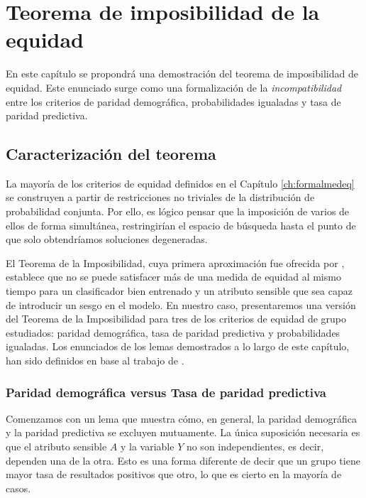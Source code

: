 \documentclass[oneside,openright,titlepage,numbers=noenddot,openany,headinclude,footinclude=true,
cleardoublepage=empty,abstractoff,BCOR=5mm,paper=a4,fontsize=12pt,main=spanish]{scrreprt}
\begin{document}
\chapter{Teorema de imposibilidad de la equidad} \label{ch:teoremaimposibilidad}

En este capítulo se propondrá una demostración del teorema de imposibilidad de equidad. Este enunciado surge como una formalización de la \textit{incompatibilidad} entre los criterios de paridad demográfica, probabilidades igualadas y tasa de paridad predictiva.

\section{Caracterización del teorema}

La mayoría de los criterios de equidad definidos en el Capítulo \ref{ch:formalmedeq} se construyen a partir de restricciones no triviales de la distribución de probabilidad conjunta. Por ello, es lógico pensar que la imposición de varios de ellos de forma simultánea, restringirían el espacio de búsqueda hasta el punto de que solo obtendríamos soluciones degeneradas.

El Teorema de la Imposibilidad, cuya primera aproximación fue ofrecida por \cite{fairth2016}, establece que no se puede satisfacer más de una medida de equidad al mismo tiempo para un clasificador bien entrenado y un atributo sensible que sea capaz de introducir un sesgo en el modelo. En nuestro caso, presentaremos una versión del Teorema de la Imposibilidad para tres de los criterios de equidad de grupo estudiados: paridad demográfica, tasa de paridad predictiva y probabilidades igualadas. Los enunciados de los lemas demostrados a lo largo de este capítulo, han sido definidos en base al trabajo de \cite{fairnesslearning2019}.


\subsection{Paridad demográfica versus Tasa de paridad predictiva}

Comenzamos con un lema que muestra cómo, en general, la paridad demográfica y la paridad predictiva se excluyen mutuamente. La única suposición necesaria es que el atributo sensible $A$ y la variable $Y$ no son independientes, es decir, dependen una de la otra. Esto es una forma diferente de decir que un grupo tiene mayor tasa de resultados positivos que otro, lo que es cierto en la mayoría de casos.
\end{document}
